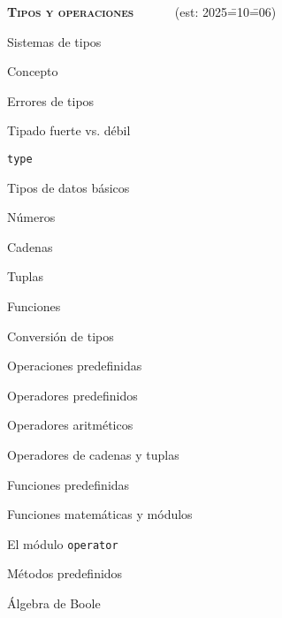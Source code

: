 \begin{longenum}
\begin{longenum}
    \end{longenum}
    \item \textbf{\textsc{Tipos y operaciones}} \ \ \ \ \ \ (est: 2025\==10\==06)
    \begin{longenum}
        \item Sistemas de tipos
        \begin{longenum}
            \item Concepto
            \item Errores de tipos
            \item Tipado fuerte vs. débil
            \item \texttt{type}
            \item Tipos de datos básicos
            \begin{longenum}
                \item Números
                \item Cadenas
                \item Tuplas
                \item Funciones
            \end{longenum}
            \item Conversión de tipos
        \end{longenum}
        \item Operaciones predefinidas
        \begin{longenum}
            \item Operadores predefinidos
            \begin{longenum}
                \item Operadores aritméticos
                \item Operadores de cadenas y tuplas
            \end{longenum}
            \item Funciones predefinidas
            \begin{longenum}
                \item Funciones matemáticas y módulos
                \begin{longenum}
                    \item El módulo \texttt{operator}
                \end{longenum}
            \end{longenum}
            \item Métodos predefinidos
        \end{longenum}
        \item Álgebra de Boole

\end{longenum}
\end{longenum}
